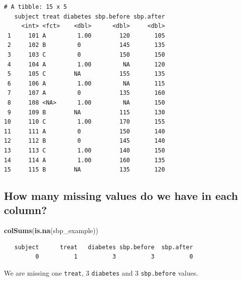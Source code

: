 \documentclass[]{book}
\newenvironment{Shaded}{\begin{snugshade}}{\end{snugshade}}
\newcommand{\KeywordTok}[1]{\textcolor[rgb]{0.13,0.29,0.53}{\textbf{#1}}}
\newcommand{\DataTypeTok}[1]{\textcolor[rgb]{0.13,0.29,0.53}{#1}}
\newcommand{\StringTok}[1]{\textcolor[rgb]{0.31,0.60,0.02}{#1}}
\newcommand{\CommentTok}[1]{\textcolor[rgb]{0.56,0.35,0.01}{\textit{#1}}}
\newcommand{\OperatorTok}[1]{\textcolor[rgb]{0.81,0.36,0.00}{\textbf{#1}}}
\newcommand{\NormalTok}[1]{#1}
\theoremstyle{definition}
\theoremstyle{definition}
\theoremstyle{definition}
\theoremstyle{remark}
\begin{document}
\begin{Shaded}
\end{Shaded}

\begin{verbatim}
# A tibble: 15 x 5
   subject treat diabetes sbp.before sbp.after
     <int> <fct>    <dbl>      <dbl>     <dbl>
 1     101 A         1.00        120       105
 2     102 B         0           145       135
 3     103 C         0           150       150
 4     104 A         1.00         NA       120
 5     105 C        NA           155       135
 6     106 A         1.00         NA       115
 7     107 A         0           135       160
 8     108 <NA>      1.00         NA       150
 9     109 B        NA           115       130
10     110 C         1.00        170       155
11     111 A         0           150       140
12     112 B         0           145       140
13     113 C         1.00        140       150
14     114 A         1.00        160       135
15     115 B        NA           135       120
\end{verbatim}

\subsection{How many missing values do we have in each
column?}\label{how-many-missing-values-do-we-have-in-each-column}

\begin{Shaded}
\begin{Highlighting}[]
\KeywordTok{colSums}\NormalTok{(}\KeywordTok{is.na}\NormalTok{(sbp_example))}
\end{Highlighting}
\end{Shaded}

\begin{verbatim}
   subject      treat   diabetes sbp.before  sbp.after 
         0          1          3          3          0 
\end{verbatim}

We are missing one \texttt{treat}, 3 \texttt{diabetes} and 3
\texttt{sbp.before} values.
\end{document}
